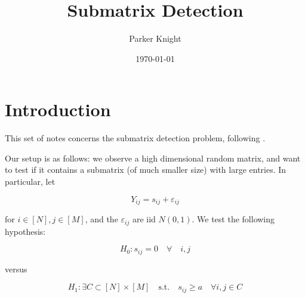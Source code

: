 \documentclass[11pt]{article}
\author{Parker Knight}
\date{\today}
\title{Submatrix Detection}
\newcommand{\eps}{\varepsilon} %
\begin{document}
\maketitle

\section{Introduction}

This set of notes concerns the submatrix detection problem, following
\cite{butucea_detection_2013}. 


Our setup is as follows: we observe a high dimensional random matrix, and want to test if it contains a submatrix (of much smaller size) with large entries. In particular, let

$$Y_{ij} = s_{ij} + \eps_{ij}$$

for $i \in [N], j \in [M]$, and the $\eps_{ij}$ are iid $N(0,1)$. We test the following hypothesis:

$$H_0: s_{ij} = 0 \quad \forall \quad i,j$$

versus

$$H_1: \exists C \subset [N] \times [M] \quad \textrm{s.t.} \quad s_{ij} \geq a \quad \forall i,j \in C$$





\end{document}
